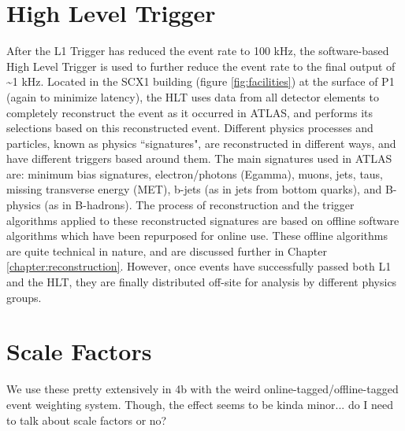 \section{High Level Trigger}
    After the L1 Trigger has reduced the event rate to 100 kHz, the software-based High Level Trigger is used to further reduce the event rate to the final output of \textasciitilde 1 kHz.
    Located in the SCX1 building (figure \ref{fig:facilities}) at the surface of P1 (again to minimize latency), the HLT uses data from all detector elements to completely reconstruct the event as it occurred in ATLAS, and performs its selections based on this reconstructed event.
    Different physics processes and particles, known as physics ``signatures", are reconstructed in different ways, and have different triggers based around them. 
    The main signatures used in ATLAS are: minimum bias signatures, electron/photons (Egamma), muons, jets, taus, missing transverse energy (MET), b-jets (as in jets from bottom quarks), and B-physics (as in B-hadrons).
    The process of reconstruction and the trigger algorithms applied to these reconstructed signatures are based on offline software algorithms which have been repurposed for online use.
    These offline algorithms are quite technical in nature, and are discussed further in Chapter \ref{chapter:reconstruction}.
    However, once events have successfully passed both L1 and the HLT, they are finally distributed off-site for analysis by different physics groups.


\section{Scale Factors} %
    We use these pretty extensively in 4b with the weird online-tagged/offline-tagged event weighting system.
    Though, the effect seems to be kinda minor... do I need to talk about scale factors or no?

